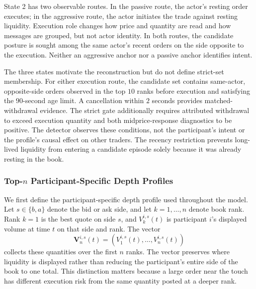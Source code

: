 \documentclass[11pt]{article}
\begin{document}
State 2 has two observable routes. In the passive route, the actor's resting order executes; in the aggressive route, the
actor initiates the trade against resting liquidity. Execution role changes how price and quantity are read and how messages
are grouped, but not actor identity. In both routes, the candidate posture is sought among the same actor's recent orders on
the side opposite to the execution. Neither an aggressive anchor nor a passive anchor identifies intent.

The three states motivate the reconstruction but do not define strict-set membership. For either execution route, the
candidate set contains same-actor, opposite-side orders observed in the top $10$ ranks before execution and satisfying the
$90$-second age limit. A cancellation within $2$ seconds provides matched-withdrawal evidence. The strict gate additionally
requires attributed withdrawal to exceed execution quantity and both midprice-response diagnostics to be positive. The
detector observes these conditions, not the participant's intent or the profile's causal effect on other traders. The recency
restriction prevents long-lived liquidity from entering a candidate episode solely because it was already resting in the book.

\subsubsection{\texorpdfstring{Top-$n$}{Top-n} Participant-Specific Depth Profiles}
\label{subsec:topn_depth_profiles}

We first define the participant-specific depth profile used throughout the model. Let $s \in \{b,a\}$ denote the bid or
ask side, and let $k=1,\ldots,n$ denote book rank. Rank $k=1$ is the best quote on side $s$, and
$V^{i,s}_{k}(t)$ is participant $i$'s displayed volume at time $t$ on that side and rank. The vector
\begin{equation}
    \mathbf{V}^{i,s}_{n}(t)
    = \left(V^{i,s}_{1}(t),\ldots,V^{i,s}_{n}(t)\right)
\end{equation}
collects these quantities over the first $n$ ranks. The vector preserves where liquidity is displayed rather than reducing
the participant's entire side of the book to one total. This distinction matters because a large order near the touch has
different execution risk from the same quantity posted at a deeper rank.
\end{document}
